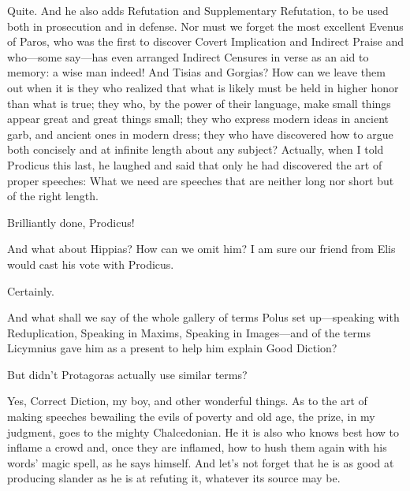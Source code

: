 \saysocrates Quite. And he also adds Refutation and Supplementary
Refutation, to be used both in prosecution and in
defense. Nor must we forget the most excellent Evenus of
Paros, who was the
first to discover Covert Implication and Indirect Praise and who---some
say---has even arranged Indirect Censures in verse as an aid to memory:
a wise man indeed! And
Tisias and Gorgias?
How can we leave them out when it is they who realized that what is
likely must be held in higher honor than what is true; they who, by the
power of their language, make small things appear great and great things
small; they who express modern ideas in ancient garb, and
ancient ones in modern dress; they who have discovered how to argue both
concisely and at infinite length about any subject? Actually, when I
told Prodicus this
last, he laughed and said that only he had discovered the art of proper
speeches: What we need are speeches that are neither long nor short but
of the right length.

\sayphaedrus Brilliantly done, Prodicus!

\saysocrates And what about
Hippias? How can we
omit him? I am sure our friend from Elis would cast his vote with
Prodicus.

\sayphaedrus Certainly.

\saysocrates And what shall we say of the whole gallery of terms
Polus set
up---speaking with Reduplication, Speaking in Maxims, Speaking in
Images---and of the terms Licymnius gave him as a present to help him
explain Good Diction?

\sayphaedrus But didn't Protagoras actually use similar
terms?

\saysocrates Yes, Correct Diction, my boy, and other wonderful things. As
to the art of making speeches bewailing the evils of poverty and old
age, the prize, in my judgment, goes to the mighty
Chalcedonian. He it is
also who knows best how to inflame a crowd and, once they are
inflamed, how to hush them again with his words' magic spell, as he says
himself. And let's not forget that he is as good at producing slander as
he is at refuting it, whatever its source may be.

